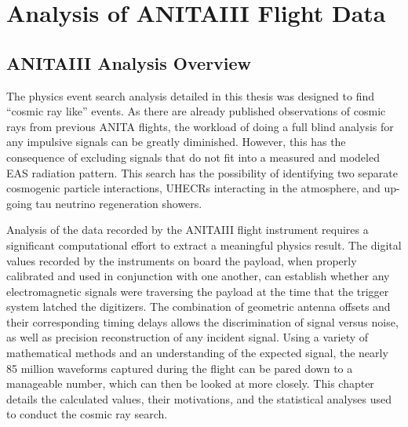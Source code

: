\chapter{Analysis of ANITAIII Flight Data}
\section{ANITAIII Analysis Overview}
	The physics event search analysis detailed in this thesis was designed to find ``cosmic ray like'' events.  As there are already published observations of cosmic rays from previous ANITA flights, the workload of doing a full blind analysis for any impulsive signals can be greatly diminished.  However, this has the consequence of excluding signals that do not fit into a measured and modeled EAS radiation pattern.  This search has the possibility of identifying two separate cosmogenic particle interactions, UHECRs interacting in the atmosphere, and up-going tau neutrino regeneration showers.
	
	Analysis of the data recorded by the ANITAIII flight instrument requires a significant computational effort to extract a meaningful physics result.  The digital values recorded by the instruments on board the payload, when properly calibrated and used in conjunction with one another, can establish whether any electromagnetic signals were traversing the payload at the time that the trigger system latched the digitizers.  The combination of geometric antenna offsets and their corresponding timing delays allows the discrimination of signal versus noise, as well as precision reconstruction of any incident signal.  Using a variety of mathematical methods and an understanding of the expected signal, the nearly 85 million waveforms captured during the flight can be pared down to a manageable number, which can then be looked at more closely.  This chapter details the calculated values, their motivations, and the statistical analyses used to conduct the cosmic ray search.
		
	

